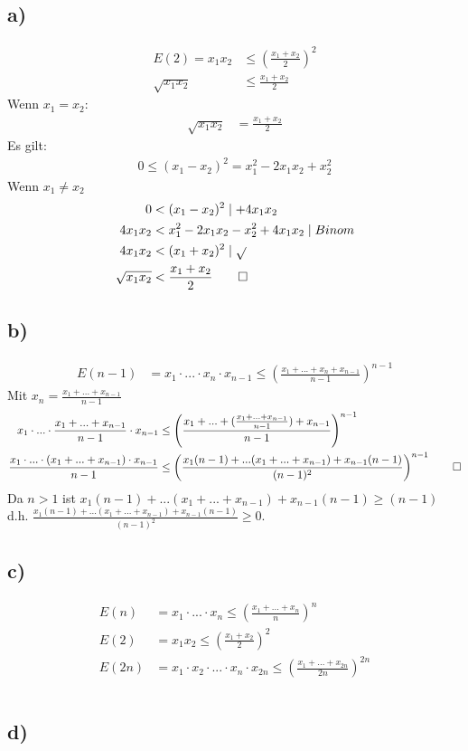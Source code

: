 \documentclass[titlepage]{article}
\begin{document}
		\subsection*{a)}
			\begin{align*}
				E(2)=x_1x_2&\le\left(\frac{x_1+x_2}{2}\right)^2\\
				\sqrt{x_1x_2}&\le\frac{x_1+x_2}{2}
			\end{align*}
		Wenn $x_1=x_2$:
		\begin{align*}
			\sqrt{x_1x_2}&=\frac{x_1+x_2}{2}
		\end{align*}
		Es gilt:
		\begin{align*}
			0\le(x_1-x_2)^2=x_1^2-2x_1x_2+x_2^2
		\end{align*}
		Wenn $x_1\neq x_2$
		\begin{align*}
			0&<(x_1-x_2)^2\mid+4x_1x_2\\
			4x_1x_2&<x_1^2-2x_1x_2-x_2^2+4x_1x_2\mid Binom\\
			4x_1x_2&<(x_1+x_2)^2\mid\sqrt{}\\
			\sqrt{x_1x_2}&<\frac{x_1+x_2}{2}\qed			
		\end{align*}
		\subsection*{b)}
			\begin{align*}
				E(n-1)&=x_1\cdot...\cdot x_n\cdot x_{n-1}\le\left(\frac{x_1+...+x_n+x_{n-1}}{n-1}\right)^{n-1}
			\end{align*}
		Mit $x_n=\frac{x_1+...+x_{n-1}}{n-1}$
		\begin{align*}
			x_1\cdot...\cdot \frac{x_1+...+x_{n-1}}{n-1}\cdot x_{n-1}&\le\left(\frac{x_1+...+(\frac{x_1+...+x_{n-1}}{n-1})+x_{n-1}}{n-1}\right)^{n-1}\\
			\frac{x_1\cdot...\cdot(x_1+...+x_{n-1})\cdot x_{n-1}}{n-1}&\le\left(\frac{x_1(n-1)+...(x_1+...+x_{n-1})+x_{n-1}(n-1)}{(n-1)^2}\right)^{n-1}\qed\\
		\end{align*}
		Da $n>1$ ist $x_1(n-1)+...(x_1+...+x_{n-1})+x_{n-1}(n-1)\ge(n-1)$ d.h. $\frac{x_1(n-1)+...(x_1+...+x_{n-1})+x_{n-1}(n-1)}{(n-1)^2}\ge0$.
		\subsection*{c)}
		\begin{align*}
			E(n)&=x_1\cdot...\cdot x_n\le\left(\frac{x_1+...+x_n}{n}\right)^n\\
			E(2)&=x_1x_2\le\left(\frac{x_1+x_2}{2}\right)^2\\
			E(2n)&=x_1\cdot x_2\cdot...\cdot x_n\cdot x_{2n}\le\left(\frac{x_1+...+x_{2n}}{2n}\right)^{2n}\\
		\end{align*}
		\begin{align*}
		\end{align*}
		\subsection*{d)}

		
\end{document}
